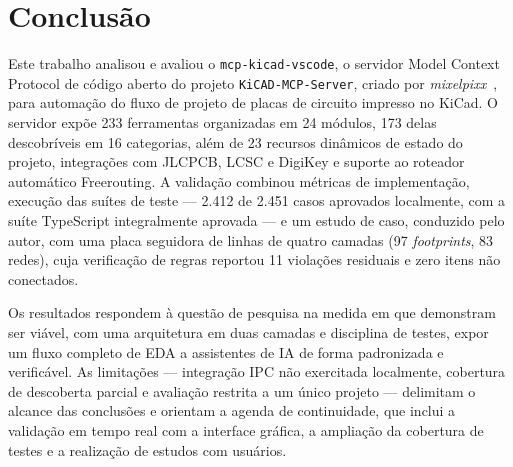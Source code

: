 \section{Conclusão}\label{sec:conclusao}

Este trabalho analisou e avaliou o \texttt{mcp-kicad-vscode}, o servidor Model
Context Protocol de código aberto do projeto \texttt{KiCAD-MCP-Server}, criado
por \emph{mixelpixx}~\citep{kicadmcpserver}, para automação do fluxo de projeto
de placas de circuito impresso no KiCad. O servidor expõe 233 ferramentas
organizadas em 24 módulos, 173 delas descobríveis em 16 categorias, além de 23
recursos dinâmicos de estado do projeto, integrações com JLCPCB, LCSC e DigiKey
e suporte ao roteador automático Freerouting. A validação combinou métricas de
implementação, execução das suítes de teste --- 2.412 de 2.451 casos aprovados
localmente, com a suíte TypeScript integralmente aprovada --- e um estudo de
caso, conduzido pelo autor, com uma placa seguidora de linhas de quatro camadas
(97 \emph{footprints}, 83 redes), cuja verificação de regras reportou 11
violações residuais e zero itens não conectados.

Os resultados respondem à questão de pesquisa na medida em que demonstram ser
viável, com uma arquitetura em duas camadas e disciplina de testes, expor um
fluxo completo de EDA a assistentes de IA de forma padronizada e verificável.
As limitações --- integração IPC não exercitada localmente, cobertura de
descoberta parcial e avaliação restrita a um único projeto --- delimitam o
alcance das conclusões e orientam a agenda de continuidade, que inclui a
validação em tempo real com a interface gráfica, a ampliação da cobertura de
testes e a realização de estudos com usuários.
